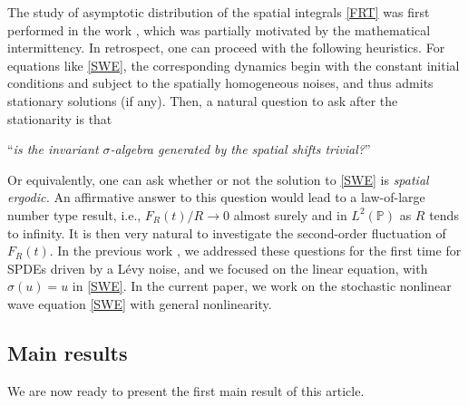 \documentclass[letterpaper, 11pt,  reqno]{amsart}
\newcommand{\s}{\sigma}
\newcommand{\PP}{\mathbb{P}}
\numberwithin{equation}{section}
\numberwithin{theorem}{section}
\begin{document}
The study of asymptotic distribution of the spatial integrals \eqref{FRT}
was first performed in the work \cite{HNV}, which was partially motivated 
by the mathematical intermittency.  
In retrospect, one can proceed with the following heuristics.
For equations like \eqref{SWE},  the corresponding 
dynamics begin with the constant initial conditions and subject to 
the spatially homogeneous noises, and thus admits stationary solutions (if 
any). Then, a natural question to ask after the stationarity is that
\begin{center}
``{\it is the invariant $\s$-algebra generated by the spatial shifts trivial?}''
\end{center}
Or equivalently, one can ask whether or not the solution to \eqref{SWE} is {\it spatial ergodic.}
An affirmative answer to this question would lead to a law-of-large number  type result,
i.e., $F_R(t)/R \to 0$ almost surely and in $L^2(\PP)$ as $R$ tends to infinity. 
It is then very natural to investigate the second-order fluctuation of $F_R(t)$.
In the previous work \cite{BZ23}, we addressed these questions for the first
time for SPDEs driven by a L\'evy noise, and we focused
on the linear equation, with $\s(u) = u$ in \eqref{SWE}.
In the current paper, we work on the stochastic nonlinear wave equation \eqref{SWE}
with general nonlinearity. 



\subsection{Main results}



We are now ready to present the first main result of this article.
\end{document}
